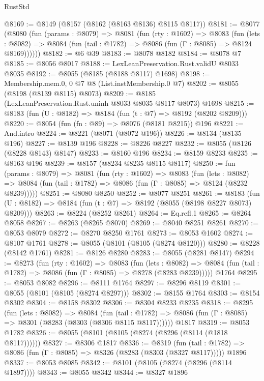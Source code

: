 \begin{lexlean}{RustStd}
\begin{coremodule}
{\begin{coremodule}
{{{{{{{{{{{{{{{{{{{{{{{{{{{{{{{{{{{{{{{{{{{{{{{@8169 := @8149 (@8157 (@8162 (@8163 @8136) @8115 @8117))
@8181 := @8077
    (@8080
      (fun (params : @8079) =>
      @8081
        (fun (rty : @1602) =>
        @8083
          (fun (lets : @8082) =>
          @8084 (fun (tail : @1782) => @8086 (fun (Γ : @8085) => @8124 @8169))))))
@8182 := @6 @39
@8183 := @8078 @8182
@8184 := @8078 @7
@8185 := @8056 @8017
@8188 := LexLeanPreservation.Rust.validU @8033 @8035
@8192 := @8055 (@8185 (@8188 @8117) @1698)
@8198 := Membership.mem.{0, 0} @7 @8 (List.instMembership.{0} @7)
@8202 := @8055 (@8198 (@8139 @8115) @8073)
@8209 := @8185 (LexLeanPreservation.Rust.uninh @8033 @8035 @8117 @8073) @1698
@8215 := @8183 (fun (U : @8182) => @8184 (fun (t : @7) => @8192 (@8202 @8209)))
@8220 := @8054 (fun (fn : @89) => @8076 (@8181 @8215)) @196
@8221 := And.intro
@8224 := @8221 (@8071 (@8072 @196))
@8226 := @8134 (@8135 @196)
@8227 := @8139 @196
@8228 := @8226 @8227
@8232 := @8055 (@8126 (@8228 @8143) @8147)
@8233 := @8160 @196
@8234 := @8159 @8233
@8235 := @8163 @196
@8239 := @8157 (@8234 @8235 @8115 @8117)
@8250 := fun (params : @8079) =>
  @8081
    (fun (rty : @1602) =>
    @8083
      (fun (lets : @8082) =>
      @8084 (fun (tail : @1782) => @8086 (fun (Γ : @8085) => @8124 (@8232 @8239)))))
@8251 := @8080 @8250
@8252 := @8077 @8251
@8261 := @8183 (fun (U : @8182) => @8184 (fun (t : @7) => @8192 (@8055 (@8198 @8227 @8073) @8209)))
@8263 := @8224 (@8252 @8261)
@8264 := Eq.refl.{1}
@8265 := @8264 @8058
@8267 := @8263 (@8265 @8070)
@8269 := @8040 @8251 @8261
@8270 := @8053 @8079
@8272 := @8270 @8250 @1761
@8273 := @8053 @1602
@8274 := @8107 @1761
@8278 := @8055 (@8101 (@8105 (@8274 @8120)))
@8280 := @8228 (@8142 @1761)
@8281 := @8126 @8280
@8283 := @8055 (@8281 @8147)
@8294 := @8273
    (fun (rty : @1602) =>
    @8083
      (fun (lets : @8082) =>
      @8084 (fun (tail : @1782) => @8086 (fun (Γ : @8085) => @8278 (@8283 @8239)))))
    @1764
@8295 := @8053 @8082
@8296 := @8111 @1764
@8297 := @8296 @8119
@8301 := @8055 (@8101 (@8105 (@8274 @8297)))
@8302 := @8155 @1764
@8303 := @8154 @8302
@8304 := @8158 @8302
@8306 := @8304 @8233 @8235
@8318 := @8295
    (fun (lets : @8082) =>
    @8084
      (fun (tail : @1782) => @8086 (fun (Γ : @8085) => @8301 (@8283 (@8303 (@8306 @8115 @8117))))))
    @1817
@8319 := @8053 @1782
@8326 := @8055 (@8101 (@8105 (@8274 (@8296 (@8114 (@1818 @8117))))))
@8327 := @8306 @1817
@8336 := @8319
    (fun (tail : @1782) => @8086 (fun (Γ : @8085) => @8326 (@8283 (@8303 (@8327 @8117)))))
    @1896
@8337 := @8053 @8085
@8342 := @8101 (@8105 (@8274 (@8296 (@8114 @1897))))
@8343 := @8055 @8342
@8344 := @8327 @1896
}}}}}}}}}}}}}}}}}}}}}}}}}}}}}}}}}}}}}}}}}}}}}}}
\end{coremodule}}
\end{coremodule}
\end{lexlean}
